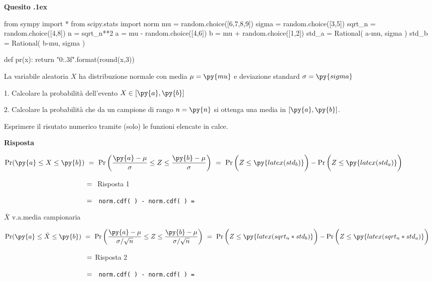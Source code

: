 \documentclass[11pt,twoside,a4paper]{article}
\newcounter{quesito}
\newenvironment{question}{\addtocounter{quesito}{1}\par\textbf{Quesito \thequesito.\kern1ex}}{\vspace{0.5\parskip}}
\newenvironment{answer}{\par\textbf{Risposta\quad}}{\vspace{\parskip}}
\begin{document}
\begin{question} %
\begin{pycode}
from sympy import *
from scipy.stats import norm
mu = random.choice([6,7,8,9])
sigma = random.choice([3,5])
sqrt_n = random.choice([4,8])
n = sqrt_n**2
a = mu - random.choice([4,6])
b = mu + random.choice([1,2])
std_a = Rational( a-mu, sigma )
std_b = Rational( b-mu, sigma )

def pr(x):
    return "{0:.3f}".format(round(x,3))
\end{pycode}
La variabile aleatoria $X$ ha distribuzione normale con media $\mu=\py{mu}$ e deviazione standard $\sigma=\py{sigma}$ 

1. Calcolare la probabilità dell'evento $X\in [\py{a},\py{b}]$ 

2. Calcolare la probabilità che da un campione di rango $n=\py{n}$ si ottenga una media in $[\py{a},\py{b}]$. 

Esprimere il risutato numerico tramite (solo) le funzioni elencate in calce.
\begin{answer}


$\displaystyle \Pr(\py{a}\le X\le\py{b})
\ =\ 
\Pr\bigg(\dfrac{\py{a}-\mu}{\sigma}\le Z\le\dfrac{\py{b}-\mu}{\sigma}\bigg)
\ =\  
\Pr\bigg(Z\le\py{latex(std_b)}\bigg) -  \Pr\bigg(Z\le\py{latex(std_a)}\bigg)$ 

$\phantom{\Pr\py{a}\le X\le\py{b})}
\ =\ 
${ 
\hfill Risposta 1}

$\phantom{\Pr\py{a}\le X\le\py{b})}
\ =\ 
${\tt\ norm.cdf(  ) -  norm.cdf(  )
= 
}

$\bar X$ v.a.\@ media campionaria

$\displaystyle \Pr(\py{a}\le\bar X\le\py{b})
\ =\ 
\Pr\bigg(\dfrac{\py{a}-\mu}{\sigma/\sqrt{n}}\le Z\le\dfrac{\py{b}-\mu}{\sigma/\sqrt{n}}\bigg)\ =\  \Pr\bigg(Z\le\py{latex(sqrt_n*std_b)}\bigg) -  \Pr\bigg(Z\le\py{latex(sqrt_n*std_a)}\bigg)$

$\phantom{\Pr\py{a}\le\bar X\le\py{b})}
\ =\ 
${\hfill Risposta 2}

$\phantom{\Pr\py{a}\le\bar X\le\py{b})}
\ =\ 
${\tt\ norm.cdf(  ) -  norm.cdf(  )
= 
}

\end{answer}
\end{question}
\end{document}
